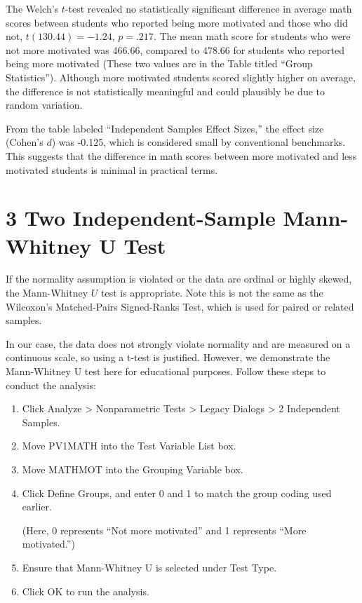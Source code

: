 \documentclass[
  letterpaper,
  DIV=11,
  numbers=noendperiod]{scrreprt}
\begin{document}
The Welch's \(t\)-test revealed no statistically significant difference
in average math scores between students who reported being more
motivated and those who did not, \(t(130.44) = -1.24\), \(p = .217\).
The mean math score for students who were not more motivated was 466.66,
compared to 478.66 for students who reported being more motivated (These
two values are in the Table titled ``Group Statistics''). Although more
motivated students scored slightly higher on average, the difference is
not statistically meaningful and could plausibly be due to random
variation.

From the table labeled ``Independent Samples Effect Sizes,'' the effect
size (Cohen's \(d\)) was -0.125, which is considered small by
conventional benchmarks. This suggests that the difference in math
scores between more motivated and less motivated students is minimal in
practical terms.

\section*{3 Two Independent-Sample Mann-Whitney U
Test}\label{two-independent-sample-mann-whitney-u-test-2}


If the normality assumption is violated or the data are ordinal or
highly skewed, the Mann-Whitney \(U\) test is appropriate. Note this is
not the same as the Wilcoxon's Matched-Pairs Signed-Ranks Test, which is
used for paired or related samples.

In our case, the data does not strongly violate normality and are
measured on a continuous scale, so using a t-test is justified. However,
we demonstrate the Mann-Whitney U test here for educational purposes.
Follow these steps to conduct the analysis:

\begin{enumerate}
\def\labelenumi{\arabic{enumi}.}
\item
  Click Analyze \textgreater{} Nonparametric Tests \textgreater{} Legacy
  Dialogs \textgreater{} 2 Independent Samples.
\item
  Move PV1MATH into the Test Variable List box.
\item
  Move MATHMOT into the Grouping Variable box.
\item
  Click Define Groups, and enter 0 and 1 to match the group coding used
  earlier.

  (Here, 0 represents ``Not more motivated'' and 1 represents ``More
  motivated.'')
\item
  Ensure that Mann-Whitney U is selected under Test Type.
\item
  Click OK to run the analysis.
\end{enumerate}
\end{document}

